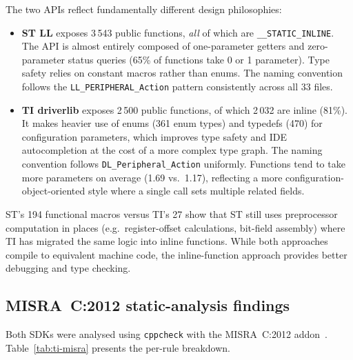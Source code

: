 The two APIs reflect fundamentally different design philosophies:

\begin{itemize}
  \item \textbf{ST LL} exposes 3\,543 public functions, \emph{all} of which are
        \texttt{\_\_STATIC\_INLINE}. The API is almost entirely composed of one-parameter
        getters and zero-parameter status queries (65\% of functions take 0 or 1 parameter).
        Type safety relies on constant macros rather than enums. The naming convention
        follows the \texttt{LL\_PERIPHERAL\_Action} pattern consistently across all 33
        files.
  \item \textbf{TI driverlib} exposes 2\,500 public functions, of which 2\,032 are inline
        (81\%). It makes heavier use of enums (361 enum types) and typedefs (470) for
        configuration parameters, which improves type safety and IDE autocompletion at the
        cost of a more complex type graph. The naming convention follows
        \texttt{DL\_Peripheral\_Action} uniformly. Functions tend to take more parameters
        on average (1.69 vs.\ 1.17), reflecting a more configuration-object-oriented
        style where a single call sets multiple related fields.
\end{itemize}

ST's 194 functional macros versus TI's 27 show that ST still uses preprocessor computation
in places (e.g.\ register-offset calculations, bit-field assembly) where TI has migrated
the same logic into inline functions. While both approaches compile to equivalent machine
code, the inline-function approach provides better debugging and type checking.

\subsection{MISRA~C:2012 static-analysis findings}
\label{subsec:ti-misra}

Both SDKs were analysed using \texttt{cppcheck} with the MISRA~C:2012
addon~\cite{misra-c2012}. Table~\ref{tab:ti-misra} presents the per-rule breakdown.

